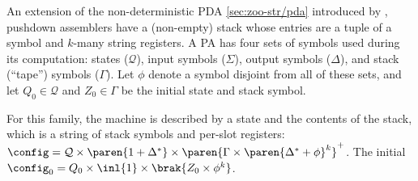 An extension of the non-deterministic PDA \autoref{sec:zoo-str/pda}
introduced by \cite{aho:pa}, pushdown assemblers have a (non-empty) stack
whose entries are a tuple of a symbol and $k$-many string registers.  A PA
has four sets of symbols used during its computation: states
($\mathcal{Q}$), input symbols ($\Sigma$), output symbols ($\Delta$), and
stack (``tape'') symbols ($\Gamma$).  Let $\phi$ denote a symbol disjoint
from all of these sets, and let $Q_0 \in \mathcal{Q}$ and $Z_0 \in \Gamma$
be the initial state and stack symbol.

For this family, the machine is described by a state and the contents of the
stack, which is a string of stack symbols and per-slot registers: $\config =
\mathcal{Q} \times \paren{1 + \Delta^*} \times \paren{ \Gamma \times
\paren{\Delta^* + \phi}^k }^+$.  The initial $\config_0 = Q_0 \times \inl{1}
\times \brak{Z_0 \times \phi^k}$.

